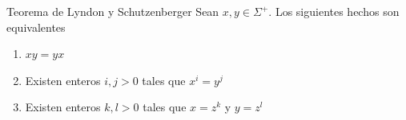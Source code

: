 Teorema de Lyndon y Schutzenberger
Sean $x,y \in \Sigma^+$. Los siguientes hechos son equivalentes

\begin{enumerate}
\item $xy = yx$
\item Existen enteros $i,j > 0$ tales que $x^i = y^j$
\item Existen enteros $k,l>0$ tales que $x = z^k$ y $y = z^l$
\end{enumerate}
